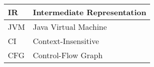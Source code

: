 \abbreviations
\begin{center}
	\renewcommand{\arraystretch}{1.5}
	\begin{longtable}{| l @{\qquad} | l |}
	\hline
	IR 			& Intermediate Representation 	\\ \hline
	JVM 		& Java Virtual Machine 			\\ \hline
  CI & Context-Insensitive \\ \hline
  CFG & Control-Flow Graph \\ \hline
	\end{longtable}
\end{center}
